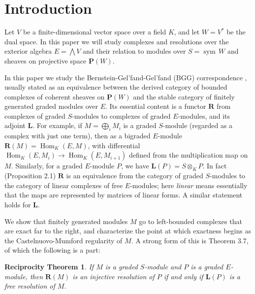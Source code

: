 \documentclass{tran-l}
\newcommand{\myHom}{\operatorname{Hom}}
\newcommand{\sym}{\operatorname{sym}}
\newcommand{\LL}{\mathbf{L}}
\newcommand{\myP}{\mathbf{P}}
\newcommand{\RR}{\mathbf{R}}
\theoremstyle{plain}
\newtheorem*{theorem1}{Reciprocity Theorem}
\theoremstyle{remark}
\theoremstyle{definition}
\begin{document}
\section*{Introduction}Let $V$ be a finite-dimensional vector space over a field $K$, and let
$W=V^{*}$ be the dual space. In this paper we will study complexes and
resolutions over the exterior algebra $E=\bigwedge V$ and their relation
to modules over $S=\sym \, W$ and sheaves on projective space $\myP (W)$.

In this paper we study the 
Bernstein-Gel'fand-Gel'fand (BGG) correspondence \cite{BGG}, usually
stated as an equivalence between the derived category of bounded
complexes of coherent sheaves on $\myP (W)$ and the stable category of
finitely generated graded modules over $E$.
Its
essential content is a functor $\RR $ from complexes of graded $S$-modules
to complexes of graded $E$-modules, and its adjoint $\LL $.
For example, if $M=\bigoplus _{i} M_{i}$ is a graded $S$-module (regarded
as a complex with just one term), then as a
bigraded
$E$-module $\RR (M)=\myHom _{K}(E,M)$, with differential
$\myHom _{K}(E,M_{i})\to \myHom _{K}(E,M_{i+1})$ defined from the multiplication map
on $M$. Similarly, for a graded $E$-module $P$, we have
$\LL (P)=S\otimes _{K}P$. In fact (Proposition 2.1) $\RR $ is an
equivalence from the category of graded
$S$-modules
to the category of linear complexes of free $E$-modules; here {\em linear\/} means essentially that the maps are represented by matrices
of linear forms. A similar statement holds for $\LL $.

We show that finitely generated modules $M$ go to left-bounded complexes
that are exact far to the right, and characterize the point at
which  exactness begins as the Castelnuovo-Mumford regularity of $M$.
A strong form of this is Theorem 3.7, of which the following is
a part:

\begin{theorem1}
If $M$ is a graded $S$-module and $P$ is a
graded
$E$-module, then $\RR (M)$ is an injective resolution of $P$ if and only if
$\LL (P)$ is a free resolution of $M$.
\end{theorem1}
\end{document}
